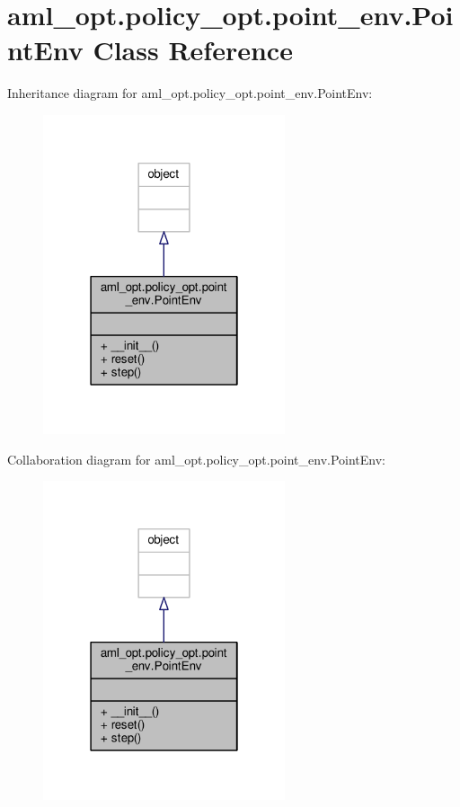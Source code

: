 \hypertarget{classaml__opt_1_1policy__opt_1_1point__env_1_1_point_env}{\section{aml\-\_\-opt.\-policy\-\_\-opt.\-point\-\_\-env.\-Point\-Env Class Reference}
\label{classaml__opt_1_1policy__opt_1_1point__env_1_1_point_env}
}


Inheritance diagram for aml\-\_\-opt.\-policy\-\_\-opt.\-point\-\_\-env.\-Point\-Env\-:
\nopagebreak
\begin{figure}[H]
\begin{center}
\leavevmode
\includegraphics[width=202pt]{classaml__opt_1_1policy__opt_1_1point__env_1_1_point_env__inherit__graph}
\end{center}
\end{figure}


Collaboration diagram for aml\-\_\-opt.\-policy\-\_\-opt.\-point\-\_\-env.\-Point\-Env\-:
\nopagebreak
\begin{figure}[H]
\begin{center}
\leavevmode
\includegraphics[width=202pt]{classaml__opt_1_1policy__opt_1_1point__env_1_1_point_env__coll__graph}
\end{center}
\end{figure}
